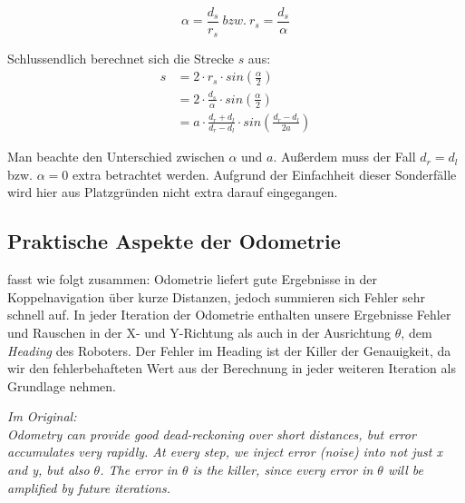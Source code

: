 \documentclass[11pt,a4paper]{article}
\begin{document}
\begin{equation}
  \alpha =  \frac{d_s}{r_s}~bzw.~ r_s = \frac{d_s}{\alpha}
\end{equation}

Schlussendlich berechnet sich die Strecke $s$ aus:
\begin{align}
  s & = 2 \cdot r_s \cdot sin(\frac{\alpha}{2}) \\
  & = 2 \cdot \frac{d_s}{\alpha}\cdot sin(\frac{\alpha}{2}) \\
  & = a \cdot \frac{d_r + d_l}{d_r - d_l} \cdot sin(\frac{d_r - d_l}{2a})
\end{align}

Man beachte den Unterschied zwischen $\alpha$ und $a$. Außerdem muss der Fall $d_r = d_l$ bzw. $\alpha = 0$ extra betrachtet werden. Aufgrund der Einfachheit 
dieser Sonderfälle wird hier aus Platzgründen nicht extra darauf eingegangen.

\subsection*{Praktische Aspekte der Odometrie}

\cite{olson2004primer} fasst wie folgt zusammen:
Odometrie liefert gute Ergebnisse in der Koppelnavigation über kurze Distanzen, jedoch summieren sich Fehler sehr schnell auf.
In jeder Iteration der Odometrie enthalten unsere Ergebnisse Fehler und Rauschen in der X- und Y-Richtung als auch in der Ausrichtung $\theta$, dem \textit{Heading}
des Roboters. Der Fehler im Heading ist der Killer der Genauigkeit, da wir den fehlerbehafteten Wert aus der Berechnung in jeder weiteren Iteration als Grundlage nehmen.

\textit{Im Original: \\
Odometry can provide good dead-reckoning over short distances, but error accumulates very
rapidly. At every step, we inject error (noise) into not just x and y, but also $\theta$. The error
in $\theta$ is the killer, since every error in $\theta$ will be amplified by future iterations.} \vspace{5mm} \\
\end{document}
